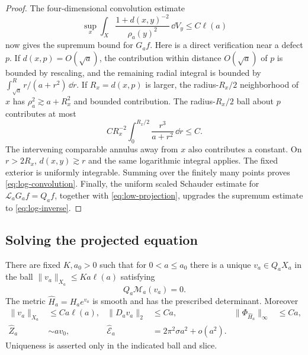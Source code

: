 \begin{proof}
The four-dimensional convolution estimate
\begin{equation}\label{eq:log-convolution}
 \sup_x\int_X\frac{1+d(x,y)^{-2}}{\rho_a(y)^2}\,\dd V_y
 \le C\ell(a)
\end{equation}
now gives the supremum bound for \(G_af\).
Here is a direct verification near a defect \(p\).
If \(d(x,p)=O(\sqrt a)\), the contribution within distance
\(O(\sqrt a)\) of \(p\) is bounded by rescaling, and the
remaining radial integral is bounded by
\(\int_{\sqrt a}^R r/(a+r^2)\,\dd r\).
If \(R_x=d(x,p)\) is larger, the radius-\(R_x/2\)
neighborhood of \(x\) has \(\rho_a^2\gtrsim a+R_x^2\)
and bounded contribution. The radius-\(R_x/2\) ball about
\(p\) contributes at most
\[
 CR_x^{-2}\int_0^{R_x/2}\frac{r^3}{a+r^2}\,\dd r\le C.
\]
The intervening comparable annulus away from \(x\) also
contributes a constant. On \(r>2R_x\), \(d(x,y)\gtrsim r\)
and the same logarithmic integral applies. The fixed
exterior is uniformly integrable. Summing over the finitely
many points proves \eqref{eq:log-convolution}.
Finally, the uniform scaled Schauder estimate for
\(\mathcal L_aG_af=Q_af\), together with
\eqref{eq:low-projection}, upgrades the supremum estimate to
\eqref{eq:log-inverse}.
\end{proof}

\subsection{Solving the projected equation}

\begin{theorem}\label{thm:projected-correction}
There are fixed \(K,a_0>0\) such that for \(0<a\le a_0\)
there is a unique \(v_a\in Q_aX_a\) in the ball
\(\|v_a\|_{X_a}\le Ka\ell(a)\) satisfying
\begin{equation}\label{eq:projected-equation}
 Q_a\mathcal M_a(v_a)=0.
\end{equation}
The metric \(\widehat H_a=H_ae^{v_a}\) is smooth and has
the prescribed determinant. Moreover
\begin{align}
 \|v_a\|_{X_a}&\le Ca\ell(a),&
 \|D_av_a\|_2&\le Ca,&
 \|\Phi_{\widehat H_a}\|_\infty&\le Ca,
                                                   \label{eq:corrected-bounds}\\
 \widehat Z_a&\sim av_0,&
 \widehat{\mathcal E}_a&=2\pi^2\sigma a^2+o(a^2).
                                                   \label{eq:corrected-energy}
\end{align}
Uniqueness is asserted only in the indicated ball and slice.
\end{theorem}

